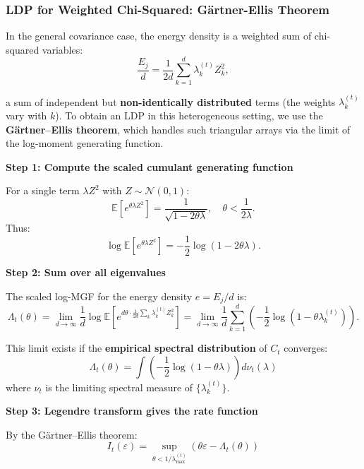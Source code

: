 \documentclass[11pt]{article}
\begin{document}
\subsubsection{LDP for Weighted Chi-Squared: G\"artner-Ellis Theorem}
In the general covariance case, the energy density is a weighted sum of chi-squared variables:
\begin{equation}
\frac{E_j}{d} = \frac{1}{2d}\sum_{k=1}^d \lambda_k^{(t)} Z_k^2,
\end{equation}

a sum of independent but \textbf{non-identically distributed} terms (the weights $\lambda_k^{(t)}$ vary with $k$). To obtain an LDP in this heterogeneous setting, we use the \textbf{G\"artner--Ellis theorem}, which handles such triangular arrays via the limit of the log-moment generating function.

\textbf{Step 1: Compute the scaled cumulant generating function}

For a single term $\lambda Z^2$ with $Z \sim \mathcal{N}(0,1)$:
\begin{equation}
\mathbb{E}[e^{\theta \lambda Z^2}] = \frac{1}{\sqrt{1 - 2\theta\lambda}}, \quad \theta < \frac{1}{2\lambda}.
\end{equation}
Thus:
\begin{equation}
\log \mathbb{E}[e^{\theta \lambda Z^2}] = -\frac{1}{2}\log(1 - 2\theta\lambda).
\end{equation}

\textbf{Step 2: Sum over all eigenvalues}

The scaled log-MGF for the energy density $e = E_j/d$ is:
\begin{equation}
\Lambda_t(\theta) = \lim_{d \to \infty} \frac{1}{d} \log \mathbb{E}\left[e^{d\theta \cdot \frac{1}{2d}\sum_k \lambda_k^{(t)} Z_k^2}\right] = \lim_{d \to \infty} \frac{1}{d} \sum_{k=1}^d \left(-\frac{1}{2}\log\left(1 - \theta\lambda_k^{(t)}\right)\right).
\end{equation}

This limit exists if the \textbf{empirical spectral distribution} of $C_t$ converges:
\begin{equation}
\Lambda_t(\theta) = \int \left(-\frac{1}{2}\log(1 - \theta\lambda)\right) d\nu_t(\lambda)
\end{equation}
where $\nu_t$ is the limiting spectral measure of $\{\lambda_k^{(t)}\}$.

\textbf{Step 3: Legendre transform gives the rate function}

By the G\"artner--Ellis theorem:
\begin{equation}
\boxed{I_t(\varepsilon) = \sup_{\theta < 1/\lambda_{\max}^{(t)}} \left(\theta\varepsilon - \Lambda_t(\theta)\right)}
\end{equation}
\end{document}
